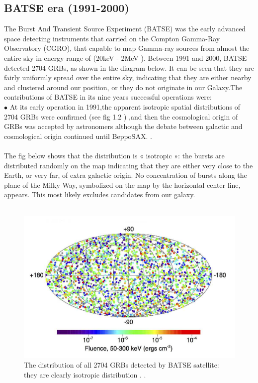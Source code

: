 \subsection{BATSE era (1991-2000)}
The Burst And Transient Source Experiment (BATSE) was the early advanced space detecting instruments that carried on the Compton Gamma-Ray Observatory (CGRO), that capable to map Gamma-ray sources from almost the entire sky in energy range of (20keV - 2MeV ). Between 1991 and 2000, BATSE detected 2704 GRBs, as shown in the diagram below. It can be seen that they are fairly uniformly spread over the entire sky, indicating that they are either nearby and clustered around our position, or they do not originate in our  Galaxy.The contributions of BATSE in its nine years successful operations were:\\
$\bullet$ At its early operation in 1991,the apparent isotropic spatial distributions of 2704 GRBs were confirmed (see fig 1.2 ) ,and then the cosmological origin of GRBs was accepted by astronomers although the debate between galactic and cosmological origin continued until BeppoSAX. \citep{5}\citep{7}.\\\\
The fig below shows that the  distribution is « isotropic »: the bursts are distributed randomly on the map indicating that they are either very close to the Earth, or very far, of extra galactic origin. No concentration of bursts along the plane of the Milky Way, symbolized on the map by the horizontal center line, appears. This most likely excludes candidates from our galaxy.\\\\
\begin{figure}[h]
\begin{center}
\includegraphics[scale=0.4]{Figures/fig2.png}
\caption{The distribution of all 2704 GRBs detected by BATSE satellite: they are clearly isotropic distribution . \citep{7}. }
\end{center}
\end{figure}
